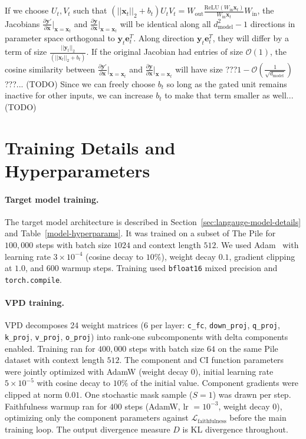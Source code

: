 \documentclass{article}
\begin{document}
If we choose $U_t, V_t$ such that $(\vert\vert\mathbf{x}_{t}\vert\vert_2+b_t)U_t V_t=W_{\text{out}}\frac{\text{ReLU}(W_{\text{in}}\mathbf{x}_t)}{W_{\text{in}}\mathbf{x}_t} W_{\text{in}}$, the Jacobians $\frac{\partial\mathbf{y'}}{\partial\mathbf{x}}\vert_{\mathbf{x}=\mathbf{x}_t}$ and $\frac{\partial\mathbf{y}}{\partial\mathbf{x}}\vert_{\mathbf{x}=\mathbf{x}_t}$ will be identical along all $d^2_{\text{model}}-1$ directions in parameter space orthogonal to $\mathbf{y}_t \mathbf{e}^T_t$. Along direction $\mathbf{y}_t \mathbf{e}^T_t$, they will differ by a term of size $\frac{\vert\vert\mathbf{y}_t\vert\vert_2}{(\vert\vert\mathbf{x}_{t}\vert\vert_2+b_t)}$. If the original Jacobian had entries of size $\mathcal{O}(1)$, the cosine similarity between $\frac{\partial\mathbf{y'}}{\partial\mathbf{x}}\vert_{\mathbf{x}=\mathbf{x}_t}$ and $\frac{\partial\mathbf{y}}{\partial\mathbf{x}}\vert_{\mathbf{x}=\mathbf{x}_t}$ will have size ???$1-\mathcal{O}(\frac{1}{\sqrt{d_{\text{model}}}})$???... (TODO)
Since we can freely choose $b_t$ so long as the gated unit remains inactive for other inputs, we can increase $b_t$ to make that term smaller as well... (TODO)


\section{Training Details and Hyperparameters}
\label{app:training-details}

\paragraph{Target model training.}
The target model architecture is described in Section~\ref{sec:langauge-model-details} and Table~\ref{model-hyperparams}.
It was trained on a subset of The Pile \citep{gao2020pile} for $100{,}000$ steps with batch size $1024$ and context length $512$.
We used Adam~\cite{kingma2017adam} with learning rate $3 \times 10^{-4}$ (cosine decay to $10\%$), weight decay $0.1$, gradient clipping at $1.0$, and $600$ warmup steps.
Training used \texttt{bfloat16} mixed precision and \texttt{torch.compile}.


\paragraph{VPD training.}
VPD decomposes 24 weight matrices (6 per layer: \texttt{c\_fc}, \texttt{down\_proj}, \texttt{q\_proj}, \texttt{k\_proj}, \texttt{v\_proj}, \texttt{o\_proj}) into rank-one subcomponents with delta components enabled.
Training ran for $400{,}000$ steps with batch size $64$ on the same Pile dataset with context length $512$.
The component and CI function parameters were jointly optimized with AdamW (weight decay $0$), initial learning rate $5 \times 10^{-5}$ with cosine decay to $10\%$ of the initial value.
Component gradients were clipped at norm $0.01$.
One stochastic mask sample ($S=1$) was drawn per step.
Faithfulness warmup ran for $400$ steps (AdamW, lr $= 10^{-3}$, weight decay $0$), optimizing only the component parameters against $\mathcal{L}_{\mathrm{faithfulness}}$ before the main training loop.
The output divergence measure $D$ is KL divergence throughout.
\end{document}
